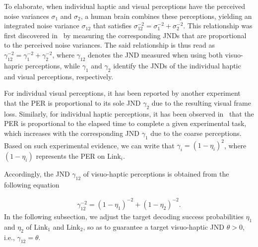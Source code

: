 \documentclass[conference]{IEEEtran}
\def\L{\text{Link}}
\begin{document}
To elaborate, when individual haptic and visual perceptions have the perceived noise variances $\sigma_1$ and $\sigma_2$, a human brain combines these perceptions, yielding an integrated noise variance $\sigma_{12}$ that satisfies $\sigma_{12}^{-2} = \sigma_1^{-2} + \sigma_2^{-2}$. This relationship was first discovered in~\cite{Ernst:2002aa} by measuring the corresponding JNDs that are proportional to the perceived noise variances. The said relationship is thus read as $\gamma_{12}^{-2}=\gamma_1^{-2} + \gamma_2^{-2}$, where $\gamma_{12}$ denotes the JND measured when using both visuo-hapric perceptions, while $\gamma_{1}$ and $\gamma_2$ identify the JNDs of the individual haptic and visual perceptions, respectively.

For individual visual perceptions, it has been reported by another experiment~\cite{Shi:10} that the PER is proportional to its sole JND $\gamma_2$ due to the resulting visual frame loss. Similarly, for individual haptic perceptions, it has been observed in~\cite{ShiHirche:16} that the PER is proportional to the elapsed time to complete a given experimental task, which increases with the corresponding JND $\gamma_1$ due to the coarse perceptions. Based on such experimental evidence, we can write that $\gamma_i=(1-\eta_i)^2$, where $(1-\eta_i)$ represents the PER on $\L_i$. 

Accordingly, the JND $\gamma_{12}$ of visuo-haptic perceptions is obtained from the following equation

\vspace{-10pt}\small\begin{align}
\gamma_{12}^{-2} = (1-\eta_1)^{-2} + (1-\eta_2)^{-2}. \label{Eq:JND}
\end{align}\normalsize
In the following subsection, we adjust the target decoding success probabilities $\eta_1$ and $\eta_2$ of $\L_1$ and $\L_2$, so as to guarantee a target visuo-haptic JND $\theta>0$, i.e., $\gamma_{12}=\theta$.
\end{document}
